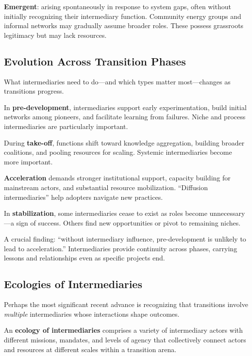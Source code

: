 \documentclass[../main.tex]{subfiles}
\begin{document}
\textbf{Emergent}: arising spontaneously in response to system gaps, often without initially recognizing their intermediary function. Community energy groups and informal networks may gradually assume broader roles. These possess grassroots legitimacy but may lack resources.

\subsection{Evolution Across Transition Phases}

What intermediaries need to do---and which types matter most---changes as transitions progress.

In \textbf{pre-development}, intermediaries support early experimentation, build initial networks among pioneers, and facilitate learning from failures. Niche and process intermediaries are particularly important.

During \textbf{take-off}, functions shift toward knowledge aggregation, building broader coalitions, and pooling resources for scaling. Systemic intermediaries become more important.

\textbf{Acceleration} demands stronger institutional support, capacity building for mainstream actors, and substantial resource mobilization. ``Diffusion intermediaries'' help adopters navigate new practices.

In \textbf{stabilization}, some intermediaries cease to exist as roles become unnecessary---a sign of success. Others find new opportunities or pivot to remaining niches.

A crucial finding: ``without intermediary influence, pre-development is unlikely to lead to acceleration.'' Intermediaries provide continuity across phases, carrying lessons and relationships even as specific projects end.

\subsection{Ecologies of Intermediaries}

Perhaps the most significant recent advance is recognizing that transitions involve \emph{multiple} intermediaries whose interactions shape outcomes.

\begin{roledef}
An \textbf{ecology of intermediaries} comprises a variety of intermediary actors with different missions, mandates, and levels of agency that collectively connect actors and resources at different scales within a transition arena.
\end{roledef}
\end{document}
